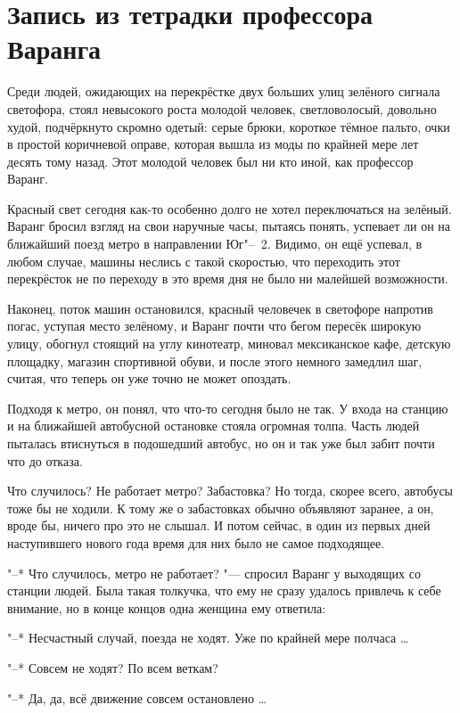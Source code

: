 \section{Запись из тетрадки профессора Варанга}

Среди людей, ожидающих на перекрёстке двух больших улиц зелёного сигнала
светофора, стоял невысокого роста молодой человек, светловолосый, довольно худой,
подчёркнуто скромно одетый: серые брюки, короткое тёмное пальто, очки в простой
коричневой оправе, которая вышла из моды по крайней мере лет десять тому назад.
Этот молодой человек был ни кто иной, как профессор Варанг.

Красный свет сегодня как-то особенно долго не хотел переключаться на зелёный.
Варанг бросил взгляд на свои наручные часы, пытаясь понять, успевает ли он на
ближайший поезд метро в направлении Юг"--~2.
Видимо, он ещё успевал, в любом случае, машины неслись с такой скоростью, что
переходить этот перекрёсток не по переходу в это время дня не было ни малейшей
возможности.

Наконец, поток машин остановился, красный человечек в светофоре напротив погас,
уступая место зелёному, и Варанг почти что бегом пересёк широкую улицу, обогнул
стоящий на углу кинотеатр, миновал мексиканское кафе, детскую площадку, магазин
спортивной обуви, и после этого немного замедлил шаг, считая, что теперь он уже
точно не может опоздать.

Подходя к метро, он понял, что что-то сегодня было не так.
У входа на станцию и на ближайшей автобусной остановке стояла огромная толпа.
Часть людей пыталась втиснуться в подошедший автобус, но он и так уже был забит
почти что до отказа.

Что случилось?
Не работает метро?
Забастовка?
Но тогда, скорее всего, автобусы тоже бы не ходили.
К тому же о забастовках обычно объявляют заранее, а он, вроде бы, ничего про это
не слышал.
И потом сейчас, в один из первых дней наступившего нового года время для них
было не самое подходящее.

"--* Что случилось, метро не работает? "--- спросил Варанг у выходящих со
станции людей.
Была такая толкучка, что ему не сразу удалось привлечь к себе внимание, но в
конце концов одна женщина ему ответила:

"--* Несчастный случай, поезда не ходят.
Уже по крайней мере полчаса \ldots

"--* Совсем не ходят?
По всем веткам?

"--* Да, да, всё движение совсем остановлено \ldots


